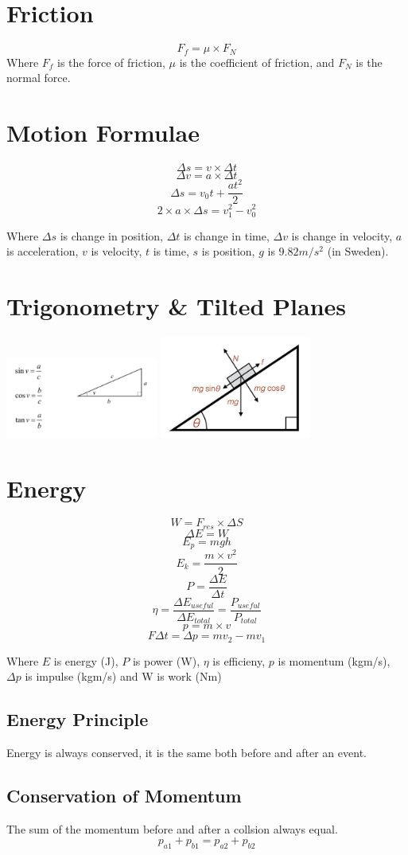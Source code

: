 \documentclass{article}
\begin{document}
\section*{Friction}
	\begin{multicols}{2}
		\[F_{f} = \mu \times F_{N}\] \break
		Where $F_f$ is the force of friction, $\mu$ is the coefficient of friction, and $F_N$ is the normal force.
	\end{multicols}
\newpage
\section*{Motion Formulae}
	\begin{multicols}{2}
		\[\Delta s = v \times \Delta t\]
		\[\Delta v = a \times \Delta t\]
		\[\Delta s = v_0 t + \frac{at^2}{2}\]
		\[2 \times a \times \Delta s = v_{1}^2 - v_{0}^2\]
	\end{multicols}
	Where $\Delta s$ is change in position, $\Delta t$ is change in time, $\Delta v$ is change in velocity, $a$ is acceleration, $v$ is velocity, $t$ is time, $s$ is position, $g$ is $9.82 m/s^2$ (in Sweden).
\section*{Trigonometry \& Tilted Planes}
	\begin{multicols}{2}
		\includegraphics[width=5cm]{trig go brrrrrr.pdf}
		\includegraphics[width=5cm]{trianglefreebody.jpeg}
	\end{multicols}
\section*{Energy}
	\begin{multicols}{2}
		\[W = F_{res} \times \Delta S\]
		\[\Delta E = W\]
		\[E_{p} = m g h\]
		\[E_{k} = \frac{m \times v ^2}{2}\]
		\[P = \frac{\Delta E}{\Delta t}\]
		\[\eta = \frac{\Delta E_{useful}}{\Delta E_{total}}= \frac{P_{useful}}{P_{total}} \]
		\[p = m \times v\]
		\[F \Delta t = \Delta p = mv_{2} - mv_{1}\]
	\end{multicols}
	Where $E$ is energy (J), $P$ is power (W), $\eta$ is efficieny, $p$ is momentum (kgm/s), $\Delta p$ is impulse (kgm/s) and W is work (Nm)
	\subsection*{Energy Principle}
		Energy is always conserved, it is the same both before and after an event.
	\subsection*{Conservation of Momentum}
		The sum of the momentum before and after a collsion always equal.
		\[p_{a1} + p_{b1} = p_{a2} + p_{b2}\]
\end{document}

